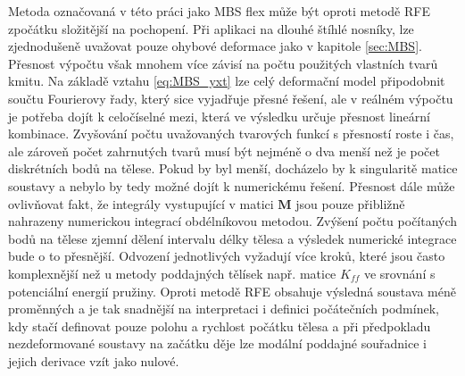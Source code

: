 Metoda označovaná v této práci jako MBS flex může být oproti metodě RFE zpočátku složitější na pochopení. Při aplikaci na dlouhé štíhlé nosníky, lze zjednodušeně uvažovat pouze ohybové deformace jako v kapitole \ref{sec:MBS}. Přesnost výpočtu však mnohem více závisí na počtu použitých vlastních tvarů kmitu. Na základě vztahu \ref{eq:MBS_yxt} lze celý deformační model připodobnit součtu Fourierovy řady, který sice vyjadřuje přesné řešení, ale v reálném výpočtu je potřeba dojít k celočíselné mezi, která ve výsledku určuje přesnost lineární kombinace. Zvyšování počtu uvažovaných tvarových funkcí s přesností roste i čas, ale zároveň počet zahrnutých tvarů musí být nejméně o dva menší než je počet diskrétních bodů na tělese. Pokud by byl menší, docházelo by k singularitě matice soustavy a nebylo by tedy možné dojít k numerickému řešení. Přesnost dále může ovlivňovat fakt, že integrály vystupující v matici $ \mathbf{M} $ jsou pouze přibližně nahrazeny numerickou integrací obdélníkovou metodou. Zvýšení počtu počítaných bodů na tělese zjemní dělení intervalu délky tělesa a výsledek numerické integrace bude o to přesnější. Odvození jednotlivých vyžadují více kroků, které jsou často komplexnější než u metody poddajných tělísek např. matice $ K_{ff} $ ve srovnání s potenciální energií pružiny. Oproti metodě RFE obsahuje výsledná soustava méně proměnných a je tak snadnější na interpretaci i definici počátečních podmínek, kdy stačí definovat pouze polohu a rychlost počátku tělesa a při předpokladu nezdeformované soustavy na začátku děje lze modální poddajné souřadnice i jejich derivace vzít jako nulové.







